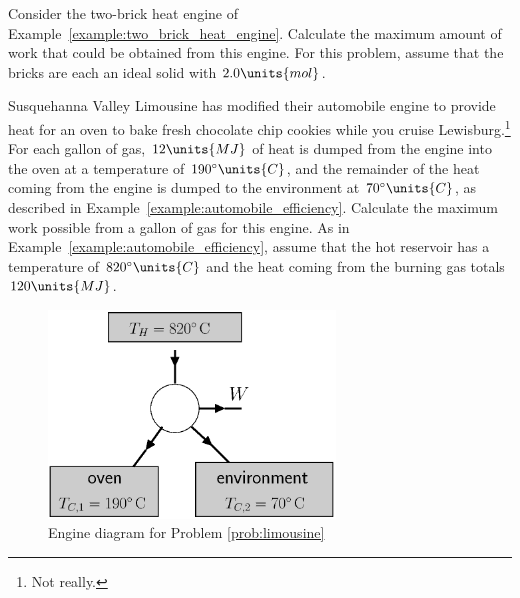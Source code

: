 \begin{problem} 
  Consider the two-brick heat engine of
  Example~\ref{example:two_brick_heat_engine}.  Calculate the maximum
  amount of work that could be obtained from this engine.  For this
  problem, assume that the bricks are each an ideal solid with 
  $2.0\units{mol}$.  
\label{prob:twobrickengine}
\end{problem}
\newpage

\begin{problem} 
  Susquehanna Valley Limousine has modified their automobile engine to
  provide heat for an oven to bake fresh chocolate chip cookies while
  you cruise Lewisburg.\footnote{Not really.}  For each gallon of gas,
  $12\units{MJ}$ of heat is dumped from the engine into the oven at a 
  temperature of $190^\circ\units{C}$, and the remainder of the heat 
  coming from the engine is dumped to the environment at 
  $70^\circ\units{C}$, as described in 
  Example~\ref{example:automobile_efficiency}.  Calculate the maximum
  work possible from a gallon of gas for this engine.  As in 
  Example~\ref{example:automobile_efficiency}, assume that the hot
  reservoir has a temperature of $820^{\circ}\units{C}$ and the 
  heat coming from the burning gas totals $120\units{MJ}$.
  \begin{figure}[h]
   \begin{center}
   \includegraphics[width=3.0in]{heat_engines/limousine.eps} 
   \end{center} 
   \caption{Engine diagram for Problem \ref{prob:limousine}}
   \end{figure}
\label{prob:limousine} 
\end{problem}
\newpage

